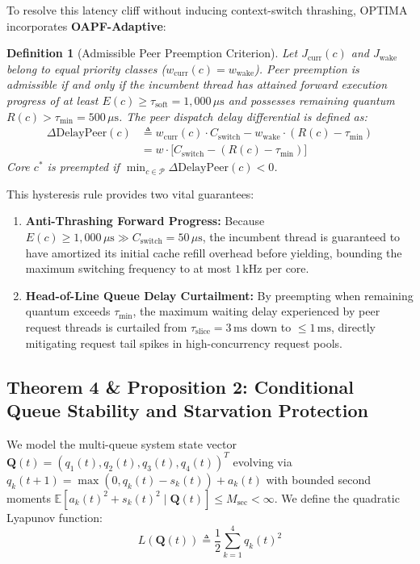 \documentclass[conference]{IEEEtran}
\newtheorem{definition}{Definition}
\begin{document}
To resolve this latency cliff without inducing context-switch thrashing, OPTIMA incorporates \textbf{OAPF-Adaptive}:
\begin{definition}[Admissible Peer Preemption Criterion]
Let $J_{\mathrm{curr}}(c)$ and $J_{\mathrm{wake}}$ belong to equal priority classes ($w_{\mathrm{curr}}(c) = w_{\mathrm{wake}}$). Peer preemption is admissible if and only if the incumbent thread has attained forward execution progress of at least $E(c) \ge \tau_{\mathrm{soft}} = 1{,}000\,\mu\mathrm{s}$ and possesses remaining quantum $R(c) > \tau_{\min} = 500\,\mu\mathrm{s}$. The peer dispatch delay differential is defined as:
\begin{align}
\label{eq:peer_delay}
\Delta\mathrm{DelayPeer}(c) &\triangleq w_{\mathrm{curr}}(c) \cdot C_{\mathrm{switch}} - w_{\mathrm{wake}} \cdot (R(c) - \tau_{\min}) \nonumber \\
&= w \cdot \Big[ C_{\mathrm{switch}} - (R(c) - \tau_{\min}) \Big]
\end{align}
Core $c^*$ is preempted if $\min_{c \in \mathcal{P}} \Delta\mathrm{DelayPeer}(c) < 0$.
\end{definition}

This hysteresis rule provides two vital guarantees:
\begin{enumerate}
    \item \textbf{Anti-Thrashing Forward Progress:} Because $E(c) \ge 1{,}000\,\mu\mathrm{s} \gg C_{\mathrm{switch}} = 50\,\mu\mathrm{s}$, the incumbent thread is guaranteed to have amortized its initial cache refill overhead before yielding, bounding the maximum switching frequency to at most $1\,\mathrm{kHz}$ per core.
    \item \textbf{Head-of-Line Queue Delay Curtailment:} By preempting when remaining quantum exceeds $\tau_{\min}$, the maximum waiting delay experienced by peer request threads is curtailed from $\tau_{\mathrm{slice}} = 3\,\mathrm{ms}$ down to $\le 1\,\mathrm{ms}$, directly mitigating request tail spikes in high-concurrency request pools.
\end{enumerate}

\subsection{Theorem 4 \& Proposition 2: Conditional Queue Stability and Starvation Protection}
\label{sec:stability_theory}
We model the multi-queue system state vector $\mathbf{Q}(t) = (q_1(t), q_2(t), q_3(t), q_4(t))^T$ evolving via $q_k(t+1) = \max(0, q_k(t) - s_k(t)) + a_k(t)$ with bounded second moments $\mathbb{E}[a_k(t)^2 + s_k(t)^2 \mid \mathbf{Q}(t)] \le M_{\mathrm{sec}} < \infty$. We define the quadratic Lyapunov function:
\begin{equation}
L(\mathbf{Q}(t)) \triangleq \frac{1}{2} \sum_{k=1}^4 q_k(t)^2
\end{equation}
\end{document}
